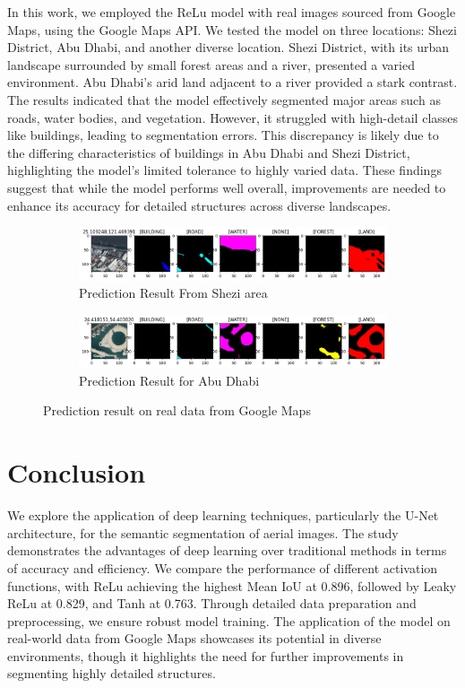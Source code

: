 \documentclass[conference]{IEEEtran}
\begin{document}
In this work, we employed the ReLu model with real images sourced from Google Maps, using the Google Maps API. We tested the model on three locations: Shezi District, Abu Dhabi, and another diverse location. Shezi District, with its urban landscape surrounded by small forest areas and a river, presented a varied environment. Abu Dhabi's arid land adjacent to a river provided a stark contrast. The results indicated that the model effectively segmented major areas such as roads, water bodies, and vegetation. However, it struggled with high-detail classes like buildings, leading to segmentation errors. This discrepancy is likely due to the differing characteristics of buildings in Abu Dhabi and Shezi District, highlighting the model's limited tolerance to highly varied data. These findings suggest that while the model performs well overall, improvements are needed to enhance its accuracy for detailed structures across diverse landscapes.

\begin{figure}[!h]
    \centering
    \begin{subfigure}[h]{\textwidth}
        \centering
        \includegraphics[width=\textwidth]{gmaps.png} 
        \caption{Prediction Result From Shezi area}
        \label{fig:shezi}
    \end{subfigure}
    \begin{subfigure}[h]{\textwidth}
        \centering
        \includegraphics[width=\textwidth]{gmaps2.png} 
        \caption{Prediction Result for Abu Dhabi}
        \label{fig:abu_dhabi}
    \end{subfigure}
    \caption{Prediction result on real data from Google Maps}
    \label{fig:real_data}
\end{figure}

\section{Conclusion}
We explore the application of deep learning techniques, particularly the U-Net architecture, for the semantic segmentation of aerial images. The study demonstrates the advantages of deep learning over traditional methods in terms of accuracy and efficiency. We compare the performance of different activation functions, with ReLu achieving the highest Mean IoU at 0.896, followed by Leaky ReLu at 0.829, and Tanh at 0.763. Through detailed data preparation and preprocessing, we ensure robust model training. The application of the model on real-world data from Google Maps showcases its potential in diverse environments, though it highlights the need for further improvements in segmenting highly detailed structures.



\end{document}
